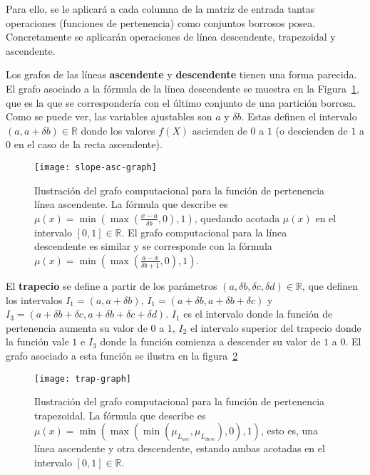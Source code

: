 Para ello, se le aplicará a cada columna de la matriz de entrada tantas operaciones (funciones de pertenencia) como conjuntos borrosos posea. Concretamente se aplicarán operaciones de línea descendente, trapezoidal y ascendente.

Los grafos de las líneas \textbf{ascendente} y \textbf{descendente} tienen una forma parecida. El grafo asociado a la fórmula de la línea descendente se muestra en la Figura~\ref{fig:slope-asc-grap}, que es la que se correspondería con el último conjunto de una partición borrosa. Como se puede ver, las variables ajustables son $a$ y $\delta b$. Estas definen el intervalo $(a, a + \delta b) \in \mathbb{R}$ donde los valores $f(X)$ ascienden de $0$ a $1$ (o descienden de $1$ a $0$ en el caso de la recta ascendente).

\begin{figure}
	\centering
	\texttt{[image: slope-asc-graph]}
	\caption[Grafo computacional de la función de pertenencia para la línea ascendente]{Ilustración del grafo computacional para la función de pertenencia línea ascendente. La fórmula que describe es $\mu(x) = \min(\max(\frac{x - a}{\delta b}, 0), 1)$, quedando acotada $\mu(x)$ en el intervalo $[0, 1] \in \mathbb{R}$. El grafo computacional para la línea descendente es similar y se corresponde con la fórmula $\mu(x) = \min(\max(\frac{a - x}{\delta b + 1}, 0), 1)$.}
	\label{fig:slope-asc-grap}
\end{figure}

El \textbf{trapecio} se define a partir de los parámetros $(a, \delta b, \delta c, \delta d) \in \mathbb{R}$, que definen los intervalos $I_1 = (a, a + \delta b)$, $I_1 = (a + \delta b, a + \delta b + \delta c)$ y $I_3 = (a + \delta b + \delta c, a + \delta b + \delta c + \delta d)$. $I_1$ es el intervalo donde la función de pertenencia aumenta su valor de $0$ a $1$, $I_2$ el intervalo superior del trapecio donde la función vale $1$ e $I_3$ donde la función comienza a descender su valor de $1$ a $0$. El grafo asociado a esta función se ilustra en la figura~\ref{fig:trap-graph}

\begin{figure}
	\centering
	\texttt{[image: trap-graph]}
	\caption[Grafo computacional de la función de pertenencia para el trapecio]{Ilustración del grafo computacional para la función de pertenencia trapezoidal. La fórmula que describe es $\mu(x) = \min(\max(\min(\mu_{L_{asc}}, \mu_{L_{desc}}), 0), 1)$, esto es, una línea ascendente y otra descendente, estando ambas acotadas en el intervalo $[0, 1] \in \mathbb{R}$.}
	\label{fig:trap-graph}
\end{figure}

